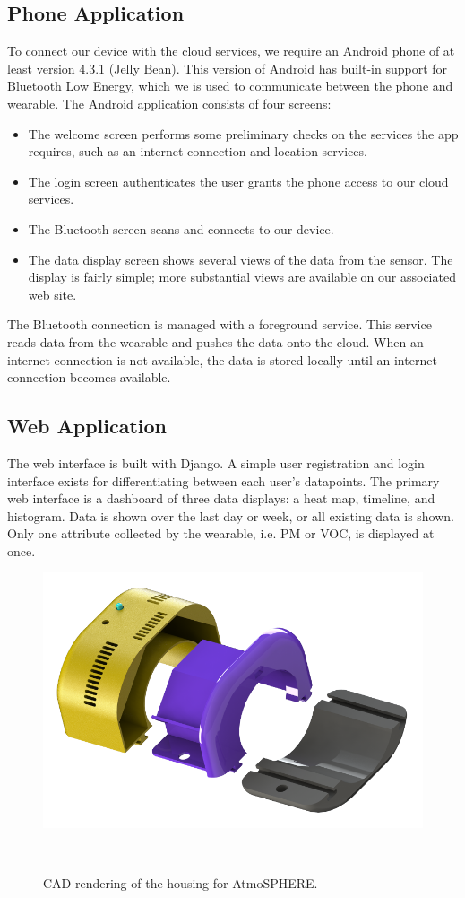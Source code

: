 \documentclass{sigchi}
\begin{document}
\subsection{Phone Application}
To connect our device with the cloud services, we require an Android phone of at least version 4.3.1 (Jelly Bean).
This version of Android has built-in support for Bluetooth Low Energy, which we is used to communicate between the phone and wearable.
The Android application consists of four screens:
\begin{itemize}
    \item The welcome screen performs some preliminary checks on the services the app requires, such as an internet connection and location services.
    \item The login screen authenticates the user grants the phone access to our cloud services.
    \item The Bluetooth screen scans and connects to our device.
    \item The data display screen shows several views of the data from the sensor.
        The display is fairly simple; more substantial views are available on our associated web site.
\end{itemize}
The Bluetooth connection is managed with a foreground service.
This service reads data from the wearable and pushes the data onto the cloud.
When an internet connection is not available, the data is stored locally until an internet connection becomes available.

\subsection{Web Application}
The web interface is built with Django.
A simple user registration and login interface exists for differentiating between each user's datapoints.
The primary web interface is a dashboard of three data displays: a heat map, timeline, and histogram.
Data is shown over the last day or week, or all existing data is shown.
Only one attribute collected by the wearable, i.e. PM or VOC, is displayed at once.
\begin{figure}
    \centering
    \includegraphics[width=0.9\columnwidth]{figures/Mechanical-Housing.png}
    \caption{CAD rendering of the housing for AtmoSPHERE.}
    ~\label{fig:housing}
\end{figure}
\end{document}
